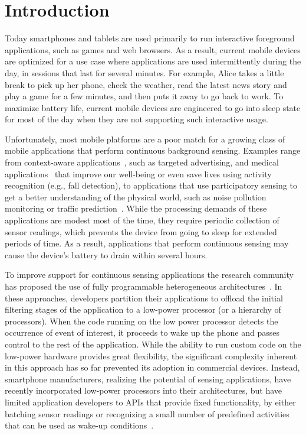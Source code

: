 
\section{\label{sec:Introduction}Introduction}

Today smartphones and tablets are used primarily to run interactive
foreground applications, such as games and web browsers.  As a result,
current mobile devices are optimized for a use case where applications
are used intermittently during the day, in sessions that last for
several minutes.  For example, Alice takes a little break to pick up
her phone, check the weather, read the latest news story and play a
game for a few minutes, and then puts it away to go back to work.  To
maximize battery life, current mobile devices are engineered to go
into sleep state for most of the day when they are not supporting such
interactive usage.

Unfortunately, most mobile platforms are a poor match for a growing
class of mobile applications that perform continuous background
sensing.  Examples range from context-aware applications~\cite{baldauf2007survey,hong2009context}, such as
targeted advertising, and medical applications~\cite{hameed2003application,preuveneers2008mobile,tsai2007usability} that improve our
well-being or even save lives using activity recognition (e.g., fall
detection), to applications that use participatory sensing to get a
better understanding of the physical world, such as noise pollution~\cite{maisonneuve2009citizen,maisonneuve2009noisetube}
monitoring or traffic prediction~\cite{hull2006cartel}.  While the processing demands of
these applications are modest most of the time, they require periodic
collection of sensor readings, which prevents the device from going to
sleep for extended periods of time.  As a result, applications that
perform continuous sensing may cause the device's battery to drain
within several hours.

To improve support for continuous sensing applications the research
community has proposed the use of fully programmable heterogeneous
architectures~\cite{reflex,littlerock,turducken}.  In these
approaches, developers partition their applications to offload the
initial filtering stages of the application to a low-power processor
(or a hierarchy of processors).  When the code running on the low
power processor detects the occurrence of event of interest, it
proceeds to wake up the phone and passes control to the rest of the
application.  While the ability to run custom code on the low-power
hardware provides great flexibility, the significant complexity
inherent in this approach has so far prevented its adoption in
commercial devices.  Instead, smartphone manufacturers, realizing the
potential of sensing applications, have recently incorporated
low-power processors into their architectures, but have limited
application developers to APIs that provide fixed functionality, by
either batching sensor readings or recognizing a small number of
predefined activities that can be used as wake-up
conditions~\cite{android4.4,motox,nexus5}.


